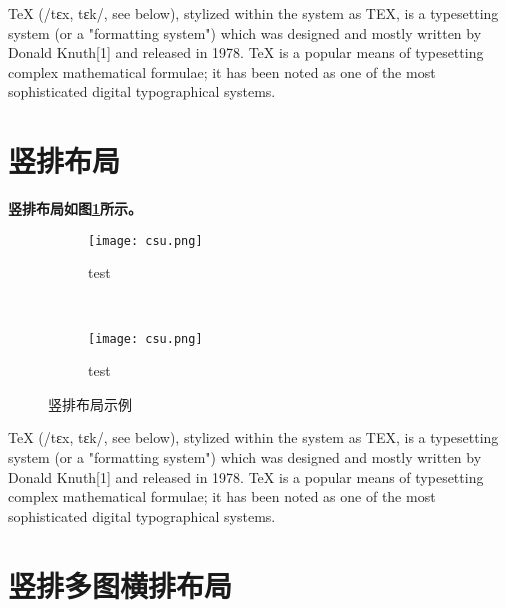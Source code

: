 TeX (/tɛx, tɛk/, see below), stylized within the system as TEX, is a typesetting system (or a "formatting system") which was designed and mostly written by Donald Knuth[1] and released in 1978. TeX is a popular means of typesetting complex mathematical formulae; it has been noted as one of the most sophisticated digital typographical systems.


\section{竖排布局}
\textbf{竖排布局如图\ref{F.csu_col}所示。}

\begin{figure}[!htb]
    \centering
    \begin{subfigure}[t]{0.15\linewidth}
        \captionsetup{justification=centering} %
        \begin{minipage}[b]{1\linewidth}
        \texttt{[image: csu.png]}
        \caption{test}
        \end{minipage}
    \end{subfigure}\\
    \begin{subfigure}[t]{0.15\linewidth}
        \captionsetup{justification=centering} %
        \begin{minipage}[b]{1\linewidth}
        \texttt{[image: csu.png]}
        \caption{test}
        \end{minipage}
    \end{subfigure}
    \caption{竖排布局示例}
    \label{F.csu_col}
\end{figure}

TeX (/tɛx, tɛk/, see below), stylized within the system as TEX, is a typesetting system (or a "formatting system") which was designed and mostly written by Donald Knuth[1] and released in 1978. TeX is a popular means of typesetting complex mathematical formulae; it has been noted as one of the most sophisticated digital typographical systems.


\section{竖排多图横排布局}

